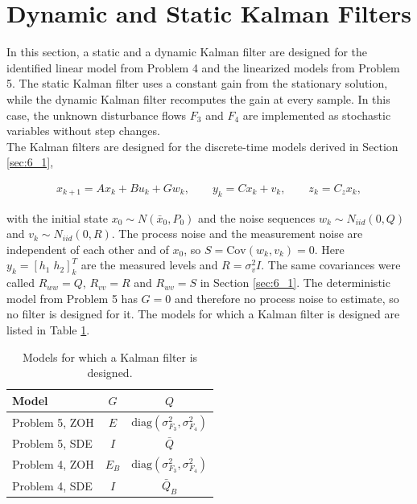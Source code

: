 


\section{Dynamic and Static Kalman Filters}
\label{sec:6_2}

In this section, a static and a dynamic Kalman filter are designed for the identified linear model from Problem 4 and the linearized models from Problem 5. The static Kalman filter uses a constant gain from the stationary solution, while the dynamic Kalman filter recomputes the gain at every sample. In this case, the unknown disturbance flows $F_3$ and $F_4$ are implemented as stochastic variables without step changes.\\

The Kalman filters are designed for the discrete-time models derived in Section \ref{sec:6_1},

\begin{align}
  x_{k+1} = Ax_k + Bu_k + Gw_k, \qquad y_k = Cx_k + v_k, \qquad z_k = C_zx_k,
\end{align}

with the initial state $x_0\sim N(\bar x_0,P_0)$ and the noise sequences $w_k\sim N_{iid}(0,Q)$ and $v_k\sim N_{iid}(0,R)$. The process noise and the measurement noise are independent of each other and of $x_0$, so $S=\mathrm{Cov}(w_k,v_k)=0$. Here $y_k=[h_1\;h_2]^T_k$ are the measured levels and $R=\sigma_v^2I$. The same covariances were called $R_{ww}=Q$, $R_{vv}=R$ and $R_{wv}=S$ in Section \ref{sec:6_1}. The deterministic model from Problem 5 has $G=0$ and therefore no process noise to estimate, so no filter is designed for it. The models for which a Kalman filter is designed are listed in Table \ref{tab:6_2}.

\begin{table}[ht]
  \centering
  \begin{tabular}{lcc}
    \hline
    Model & $G$ & $Q$ \\
    \hline
    Problem 5, ZOH & $E$ & $\mathrm{diag}(\sigma_{F_3}^2,\sigma_{F_4}^2)$ \\
    Problem 5, SDE & $I$ & $\bar Q$ \\
    Problem 4, ZOH & $E_B$ & $\mathrm{diag}(\sigma_{F_3}^2,\sigma_{F_4}^2)$ \\
    Problem 4, SDE & $I$ & $\bar Q_B$ \\
    \hline
  \end{tabular}
  \caption{Models for which a Kalman filter is designed.}
  \label{tab:6_2}
\end{table}

